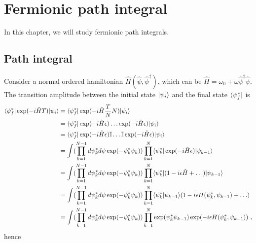 \chapter{Fermionic path integral}

    In this chapter, we will study fermionic path integrals.

\section{Path integral}

    Consider a normal ordered hamiltonian $\hat H(\hat \psi, \hat \psi^\dagger)$, which can be $\hat H = \omega_0 + \omega \hat \psi^\dagger \hat \psi$. The transition amplitude between the initial state $\vert\psi_i\rangle$ and the final state $\langle\psi^*_f\vert$ is 
    \begin{equation*}
    \begin{aligned}
        \langle\psi^*_f\vert \exp(- i \hat H T) \vert\psi_i\rangle & = \langle\psi^*_f\vert \exp(- i \hat H \frac{T}{N} N) \vert\psi_i\rangle \\ & = \langle\psi^*_f\vert \exp(- i \hat H \epsilon) \ldots \exp(- i \hat H \epsilon) \vert\psi_i\rangle \\ & = \langle\psi^*_f\vert \exp(- i \hat H \epsilon) \mathbb I \ldots \mathbb I \exp(- i \hat H \epsilon) \vert\psi_i\rangle \\ & = \int ( \prod_{k=1}^{N-1} d\psi^*_k d\psi \exp(- \psi^*_k \psi_k) ) \prod_{k=1}^{N} \langle\psi_k^*\vert \exp(- i \hat H \epsilon) \vert\psi_{k-1}\rangle \\ & = \int ( \prod_{k=1}^{N-1} d\psi^*_k d\psi \exp(- \psi^*_k \psi_k) ) \prod_{k=1}^{N} \langle\psi_k^*\vert (1 - i \epsilon \hat H + \ldots) \vert\psi_{k-1}\rangle \\ & = \int ( \prod_{k=1}^{N-1} d\psi^*_k d\psi \exp(- \psi^*_k \psi_k) ) \prod_{k=1}^{N} \langle\psi_k^*\vert\psi_{k-1}\rangle (1 - i \epsilon H (\psi_k^*,\psi_{k-1}) + \ldots) \\ & = \int ( \prod_{k=1}^{N-1} d\psi^*_k d\psi \exp(- \psi^*_k \psi_k) ) \prod_{k=1}^{N} \exp(\psi^*_k \psi_{k-1}) \exp(- i \epsilon H (\psi^*_k, \psi_{k-1})) ~,
    \end{aligned}
    \end{equation*}
    hence 
